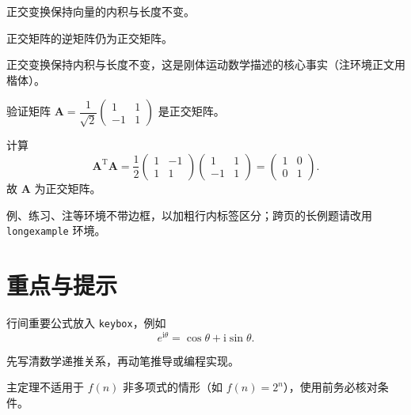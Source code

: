 \begin{lemma}[正交化的保持性]
正交变换保持向量的内积与长度不变。
\end{lemma}

\begin{corollary}
正交矩阵的逆矩阵仍为正交矩阵。
\end{corollary}

\begin{remark}
正交变换保持内积与长度不变，这是刚体运动数学描述的核心事实（注环境正文用楷体）。
\end{remark}

\begin{example}[求正交化验证]
验证矩阵 $\boldsymbol{A}=\dfrac{1}{\sqrt{2}}\begin{pmatrix}1 & 1\\ -1 & 1\end{pmatrix}$ 是正交矩阵。
\end{example}
\begin{solution}
计算
\[
	\boldsymbol{A}^{\mathrm{T}}\boldsymbol{A}
	=\frac12\begin{pmatrix}1 & -1\\ 1 & 1\end{pmatrix}
	\begin{pmatrix}1 & 1\\ -1 & 1\end{pmatrix}
	=\begin{pmatrix}1 & 0\\ 0 & 1\end{pmatrix}.
\]
故 $\boldsymbol{A}$ 为正交矩阵。
\end{solution}

\begin{note}
例、练习、注等环境不带边框，以加粗行内标签区分；跨页的长例题请改用 \texttt{longexample} 环境。
\end{note}

\section{重点与提示}
\begin{keybox}[必记结论]
行间重要公式放入 \texttt{keybox}，例如
\[
	e^{\mathrm{i}\theta}=\cos\theta+\mathrm{i}\sin\theta .
\]
\end{keybox}

\begin{tipbox}
先写清数学递推关系，再动笔推导或编程实现。
\end{tipbox}

\begin{warnbox}
主定理不适用于 $f(n)$ 非多项式的情形（如 $f(n)=2^{n}$），使用前务必核对条件。
\end{warnbox}

